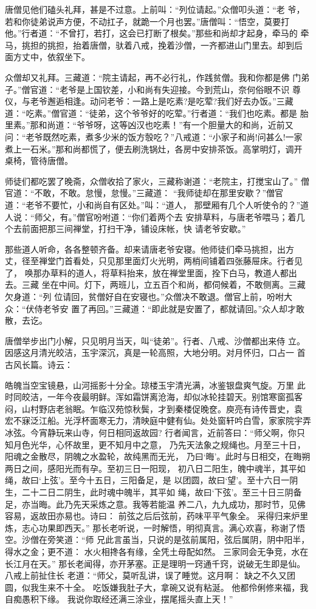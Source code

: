 唐僧见他们磕头礼拜，甚是不过意。上前叫：“列位请起。”众僧叩头道：“老
爷，若和你徒弟说声方便，不动扛子，就跪一个月也罢。”唐僧叫：“悟空，莫要打
他。”行者道：“不曾打，若打，这会已打断了根矣。”那些和尚却才起身，牵马的
牵马，挑担的挑担，抬着唐僧，驮着八戒，挽着沙僧，一齐都进山门里去。却到后
面方丈中，依叙坐下。

众僧却又礼拜。三藏道：“院主请起，再不必行礼，作践贫僧。我和你都是佛
门弟子。”僧官道：“老爷是上国钦差，小和尚有失迎接。今到荒山，奈何俗眼不识
尊仪，与老爷邂逅相逢。动问老爷：一路上是吃素?是吃荤?我们好去办饭。”三藏
道：“吃素。”僧官道：“徒弟，这个爷爷好的吃荤。”行者道：“我们也吃素。都是
胎里素。”那和尚道：“爷爷呀，这等凶汉也吃素！”有一个胆量大的和尚，近前又
问：“老爷既然吃素，煮多少米的饭方彀吃？”八戒道：“小家子和尚!问甚么!一家
煮上一石米。”那和尚都慌了，便去刷洗锅灶，各房中安排茶饭。高掌明灯，调开
桌椅，管待唐僧。

师徒们都吃罢了晚斋，众僧收拾了家火，三藏称谢道：“老院主，打搅宝山了。”
僧官道：“不敢，不敢。怠慢，怠慢。”三藏道：
“我师徒却在那里安歇？”僧官道：“老爷不要忙，小和尚自有区处。”叫：“道人，
那壁厢有几个人听使令的？”道人说：“师父，有。”僧官吩咐道：“你们着两个去
安排草料，与唐老爷喂马；着几个去前面把那三间禅堂，打扫干净，铺设床帐，快
请老爷安歇。”

那些道人听命，各各整顿齐备。却来请唐老爷安寝。他师徒们牵马挑担，出方
丈，径至禅堂门首看处，只见那里面灯火光明，两梢间铺着四张藤屉床。行者见了，
唤那办草料的道人，将草料抬来，放在禅堂里面，拴下白马，教道人都出去。三藏
坐在中间。灯下，两班儿，立五百个和尚，都伺候着，不敢侧离。三藏欠身道：“列
位请回，贫僧好自在安寝也。”众僧决不敢退。僧官上前，吩咐大众：“伏侍老爷安
置了再回。”三藏道：“即此就是安置了，都就请回。”众人却才敢散，去讫。

唐僧举步出门小解，只见明月当天，叫“徒弟”。行者、八戒、沙僧都出来侍
立。因感这月清光皎洁，玉宇深沉，真是一轮高照，大地分明。对月怀归，口占一
首古风长篇。诗云：

皓魄当空宝镜悬，山河摇影十分全。琼楼玉宇清光满，冰鉴银盘爽气旋。万里
此时同皎洁，一年今夜最明鲜。浑如霜饼离沧海，却似冰轮挂碧天。别馆寒窗孤客
闷，山村野店老翁眠。乍临汉苑惊秋鬓，才到秦楼促晚奁。庾亮有诗传晋史，袁
宏不寐泛江船。光浮杯面寒无力，清映庭中健有仙。处处窗轩吟白雪，家家院宇弄
冰弦。今宵静玩来山寺，何日相同返故园?
行者闻言，近前答曰：“师父啊，你只知月色光华，心怀故里，更不知月中之意，
乃先天法象之规绳也。月至三十日，阳魂之金散尽，阴魄之水盈轮，故纯黑而无光，
乃曰‘晦’。此时与日相交，在晦朔两日之间，感阳光而有孕。至初三日一阳现，
初八日二阳生，魄中魂半，其平如绳，故曰‘上弦’。至今十五日，三阳备足，是
以团圆，故曰‘望’。至十六日一阴生，二十二日二阴生，此时魂中魄半，其平如
绳，故曰‘下弦’。至三十日三阴备足，亦当晦。此乃先天采炼之意。我等若能温
养二八，九九成功，那时节，见佛容易，返故田亦易也。诗曰：
前弦之后后弦前，药味平平气象全。
采得归来炉里炼，志心功果即西天。”
那长老听说，一时解悟，明彻真言。满心欢喜，称谢了悟空。沙僧在旁笑道：“师
兄此言虽当，只说的是弦前属阳，弦后属阴，阴中阳半，得水之金；更不道：
水火相搀各有缘，全凭土母配如然。
三家同会无争竞，水在长江月在天。”
那长老闻得，亦开茅塞。正是理明一窍通千窍，说破无生即是仙。八戒上前扯住长
老道：“师父，莫听乱讲，误了睡觉。这月啊：
缺之不久又团圆，似我生来不十全。
吃饭嫌我肚子大，拿碗又说有粘涎。
他都伶俐修来福，我自痴愚积下缘。
我说你取经还满三涂业，摆尾摇头直上天！”


